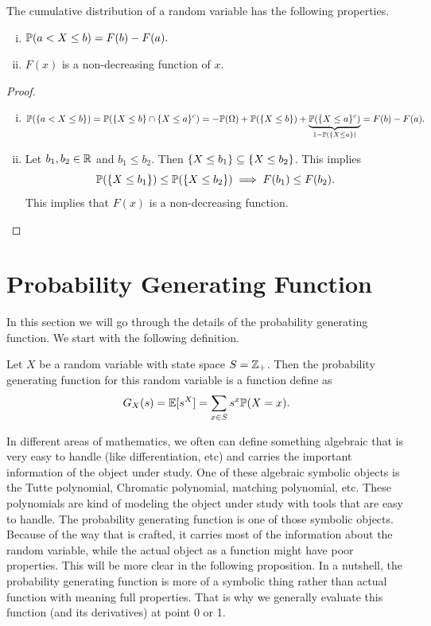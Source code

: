\begin{proposition}
	The cumulative distribution of a random variable has the following properties.
	\begin{enumerate}[(i),itemsep=0pt, topsep=5pt]
		\item $\mathbb{P}(a<X\leq b) = F(b) - F(a).$
		\item $F(x)$ is a non-decreasing function of $x$.
	\end{enumerate}
\end{proposition}
\begin{proof}
	\begin{enumerate}[(i)]
		\item 
		\[ \mathbb{P}(\{a<X\leq b\}) = \mathbb{P}(\{X\leq b\} \cap \{X\leq a\}^c) = -\mathbb{P}(\Omega) + \mathbb{P}(\{X\leq b\}) + \underbrace{\mathbb{P}(\{X\leq a\}^c)}_{1-\mathbb{P}(\{X\leq a\})} = F(b) - F(a).  \]
		\item Let $b_1, b_2 \in \mathbb{R}$ and $b_1 \leq b_2$. Then $\{X\leq b_1\} \subseteq \{X\leq b_2\}$. This implies $$\mathbb{P}(\{X\leq b_1\}) \leq \mathbb{P}(\{X\leq b_2\}) \implies F(b_1) \leq F(b_2).$$
		This implies that $F(x)$ is a non-decreasing function. 
	\end{enumerate}
\end{proof}


\section{Probability Generating Function}
In this section we will go through the details of the probability generating function. We start with the following definition.

\begin{definition}
	Let $ X $ be a random variable with state space $ S = \mathbb{Z}_+ $. Then the probability generating function for this random variable is a function define as
	\[  G_X(s) = \mathbb{E}[s^X] = \sum_{x \in S}s^x \mathbb{P}(X=x).  \]
\end{definition}

In different areas of mathematics, we often can define something algebraic that is very easy to handle (like differentiation, etc) and carries the important information of the object under study. One of these algebraic symbolic objects is the Tutte polynomial, Chromatic polynomial, matching polynomial, etc. These polynomials are kind of modeling the object under study with tools that are easy to handle. The probability generating function is one of those symbolic objects. Because of the way that is crafted, it carries most of the information about the random variable, while the actual object as a function might have poor properties. This will be more clear in the following proposition. In a nutshell, the probability generating function is more of a symbolic thing rather than actual function with meaning full properties. That is why we generally evaluate this function (and its derivatives) at point 0 or 1. 


